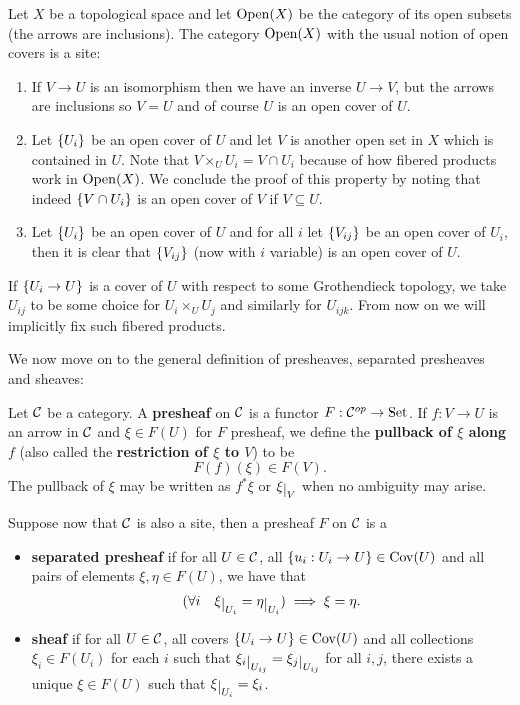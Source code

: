 \begin{example}
Let $X$ be a topological space and let $\operatorname{Open}(X)$ be the category of its open subsets (the arrows are inclusions). The category $\operatorname{Open}(X)$ with the usual notion of open covers is a site:
\begin{enumerate}
\item If $V\to U$ is an isomorphism then we have an inverse $U\to V$, but the arrows are inclusions so $V=U$ and of course $U$ is an open cover of $U$.
\item Let $\left\{{U_i}\right\}$ be an open cover of $U$ and let $V$ is another open set in $X$ which is contained in $U$. Note that $V\times_U U_i=V\cap U_i$ because of how fibered products work in $\operatorname{Open}(X)$. We conclude the proof of this property by noting that indeed $\left\{{V\cap U_i}\right\}$ is an open cover of $V$ if $V\subseteq U$.
\item Let $\left\{{U_i}\right\}$ be an open cover of $U$ and for all $i$ let $\left\{{V_{ij}}\right\}$ be an open cover of $U_i$, then it is clear that $\left\{{V_{ij}}\right\}$ (now with $i$ variable) is an open cover of $U$.
\end{enumerate}
\end{example}

\begin{notation}
If $\left\{{U_i\to U}\right\}$ is a cover of $U$ with respect to some Grothendieck topology, we take $U_{ij}$ to be some choice for $U_i\times_U U_j$ and similarly for $U_{ijk}$. From now on we will implicitly fix such fibered products.
\end{notation}

We now move on to the general definition of presheaves, separated presheaves and sheaves:
\begin{definition}[]
Let $\mathcal{C}$ be a category. A \textbf{presheaf} on $\mathcal{C}$ is a functor $F:\mathcal{C}^{op}\to \mathrm{Set}$. If $f:V\to U$ is an arrow in $\mathcal{C}$ and $\xi\in F(U)$ for $F$ presheaf, we define the \textbf{pullback of $\xi$ along $f$} (also called the \textbf{restriction of $\xi$ to $V$}) to be
\[F(f)(\xi)\in F(V).\]
The pullback of $\xi$ may be written as $f^\ast\xi$ or $\xi\res V$ when no ambiguity may arise.
\bigskip

\noindent
Suppose now that $\mathcal{C}$ is also a site, then a presheaf $F$ on $\mathcal{C}$ is a
\begin{itemize}
\item \textbf{separated presheaf} if for all $U\in \mathcal{C}$, all $\left\{{u_i:U_i\to U}\right\}\in \operatorname{Cov}(U)$ and all pairs of elements $\xi,\eta\in F(U)$, we have that
\[(\forall i\quad \xi\res{U_i}=\eta\res{U_i})\implies \xi=\eta.\]
\item \textbf{sheaf} if for all $U\in \mathcal{C}$, all covers $\left\{{U_i\to U}\right\}\in \operatorname{Cov}(U)$ and all collections $\xi_i\in F(U_i)$ for each $i$ such that $\xi_i\res{U_{ij}}=\xi_j\res{U_{ij}}$ for all $i,j$, there exists a unique $\xi\in F(U)$ such that $\xi\res{U_i}=\xi_i$.
\end{itemize} 
\end{definition}

